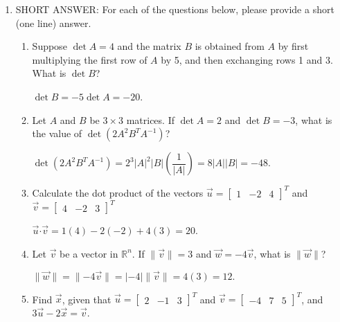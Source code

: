 \documentclass[12pt]{article}
\newcommand{\points}[1]{\marginpar{\hspace{24pt}[#1]}}
\newcommand{\R}{\mathbb{R}}
\newcommand{\dotp}{\boldsymbol{\cdot}}
\newcommand{\abs}[1]{\lvert #1\rvert}
\newcommand{\len}[1]{\lVert #1\rVert}
\begin{document}
\begin{enumerate}
\item SHORT ANSWER: For each of the questions below, please provide a short (one line) answer.
 \begin{enumerate}
\item Suppose $\det A = 4$ and the matrix $B$ is obtained from $A$ by  \points{2} first multiplying the first row of $A$ by 5, and then exchanging rows 1 and 3. What is $\det B$?

\bigskip

$\det B = -5\det A = -20$.

\bigskip

\item Let $A$ and $B$ be $3\times 3$ matrices. If $\det A=2$ and $\det B = -3$, what is the value of \points{2} $\det(2A^2B^TA^{-1})$?

\bigskip

$\det(2A^2B^TA^{-1}) = 2^3\abs{A}^2\abs{B}\left(\dfrac{1}{\abs{A}}\right) = 8\abs{A}\abs{B} = -48.$

\bigskip

\item Calculate the dot product of the vectors $\vec{u}=\begin{bmatrix}1&-2&4\end{bmatrix}^T$ and $\vec{v} = \begin{bmatrix}4&-2&3\end{bmatrix}^T$ \points{2}

\bigskip

$\vec{u}\dotp\vec{v} = 1(4)-2(-2)+4(3) = 20$.

\bigskip


\item Let $\vec{v}$ be a vector in $\R^n$. If $\len{\vec{v}}=3$ and $\vec{w} = -4\vec{v}$, what is $\len{\vec{w}}$? \points{2}

\bigskip

$\len{\vec{w}}=\len{-4\vec{v}} = \abs{-4}\len{\vec{v}} = 4(3)=12.$

\bigskip

\item Find $\vec{x}$, given that $\vec{u} = \begin{bmatrix}2&-1&3\end{bmatrix}^T$ and $\vec{v} = \begin{bmatrix}-4&7&5\end{bmatrix}^T$, and $3\vec{u}-2\vec{x}=\vec{v}$. \points{2}

\bigskip


\end{enumerate}
\end{enumerate}
\end{document}
